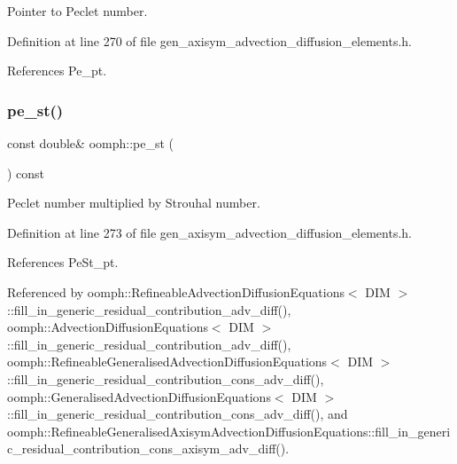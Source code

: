 Pointer to Peclet number. 



Definition at line 270 of file gen\+\_\+axisym\+\_\+advection\+\_\+diffusion\+\_\+elements.\+h.



References Pe\+\_\+pt.

\mbox{\label{namespaceoomph_a7f4533f76fda86b1fe191b46ae452971}} 
\subsubsection{\texorpdfstring{pe\+\_\+st()}{pe\_st()}}
{\footnotesize\ttfamily const double\& oomph\+::pe\+\_\+st (\begin{DoxyParamCaption}{ }\end{DoxyParamCaption}) const}



Peclet number multiplied by Strouhal number. 



Definition at line 273 of file gen\+\_\+axisym\+\_\+advection\+\_\+diffusion\+\_\+elements.\+h.



References Pe\+St\+\_\+pt.



Referenced by oomph\+::\+Refineable\+Advection\+Diffusion\+Equations$<$ D\+I\+M $>$\+::fill\+\_\+in\+\_\+generic\+\_\+residual\+\_\+contribution\+\_\+adv\+\_\+diff(), oomph\+::\+Advection\+Diffusion\+Equations$<$ D\+I\+M $>$\+::fill\+\_\+in\+\_\+generic\+\_\+residual\+\_\+contribution\+\_\+adv\+\_\+diff(), oomph\+::\+Refineable\+Generalised\+Advection\+Diffusion\+Equations$<$ D\+I\+M $>$\+::fill\+\_\+in\+\_\+generic\+\_\+residual\+\_\+contribution\+\_\+cons\+\_\+adv\+\_\+diff(), oomph\+::\+Generalised\+Advection\+Diffusion\+Equations$<$ D\+I\+M $>$\+::fill\+\_\+in\+\_\+generic\+\_\+residual\+\_\+contribution\+\_\+cons\+\_\+adv\+\_\+diff(), and oomph\+::\+Refineable\+Generalised\+Axisym\+Advection\+Diffusion\+Equations\+::fill\+\_\+in\+\_\+generic\+\_\+residual\+\_\+contribution\+\_\+cons\+\_\+axisym\+\_\+adv\+\_\+diff().

\mbox{\label{namespaceoomph_a996fd022407db74d470a6989afe05add}} 
